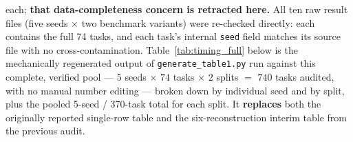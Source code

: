 
each; \textbf{that data-completeness concern is retracted here.} All ten
raw result files (five seeds $\times$ two benchmark variants) were
re-checked directly: each contains the full 74 tasks, and each task's
internal \texttt{seed} field matches its source file with no
cross-contamination. Table~\ref{tab:timing_full} below is the mechanically
regenerated output of \texttt{generate\_table1.py} run against this
complete, verified pool --- $5$ seeds $\times$ $74$ tasks $\times$ $2$
splits $=$ $740$ tasks audited, with no manual number editing --- broken
down by individual seed and by split, plus the pooled 5-seed / 370-task
total for each split. It \textbf{replaces} both the originally reported
single-row table and the six-reconstruction interim table from the
previous audit.

